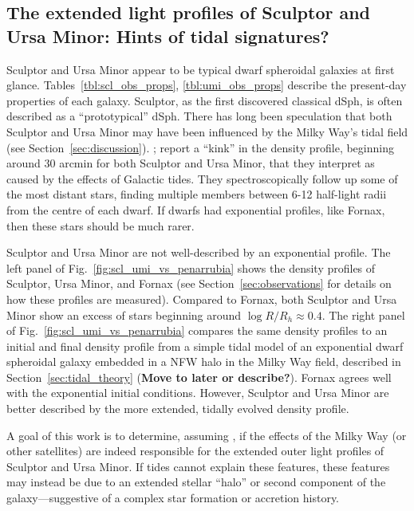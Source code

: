 \subsection{The extended light profiles of Sculptor and Ursa Minor:
Hints of tidal
signatures?}\label{the-extended-light-profiles-of-sculptor-and-ursa-minor-hints-of-tidal-signatures}

Sculptor and Ursa Minor appear to be typical dwarf spheroidal galaxies
at first glance. Tables~\ref{tbl:scl_obs_props}, \ref{tbl:umi_obs_props}
describe the present-day properties of each galaxy. Sculptor, as the
first discovered classical dSph, is often described as a
``prototypical'' dSph. There has long been speculation that both
Sculptor and Ursa Minor may have been influenced by the Milky Way's
tidal field (see Section~\ref{sec:discussion}). \citet{sestito+2023a};
\citet{sestito+2023b} report a ``kink'' in the density profile,
beginning around 30 arcmin for both Sculptor and Ursa Minor, that they
interpret as caused by the effects of Galactic tides. They
spectroscopically follow up some of the most distant stars, finding
multiple members between 6-12 half-light radii from the centre of each
dwarf. If dwarfs had exponential profiles, like Fornax, then these stars
should be much rarer.

Sculptor and Ursa Minor are not well-described by an exponential
profile. The left panel of Fig.~\ref{fig:scl_umi_vs_penarrubia} shows
the density profiles of Sculptor, Ursa Minor, and Fornax (see
Section~\ref{sec:observations} for details on how these profiles are
measured). Compared to Fornax, both Sculptor and Ursa Minor show an
excess of stars beginning around \(\log R/R_h\approx 0.4\). The right
panel of Fig.~\ref{fig:scl_umi_vs_penarrubia} compares the same density
profiles to an initial and final density profile from a simple tidal
model of an exponential dwarf spheroidal galaxy embedded in a NFW halo
in the Milky Way field, described in Section~\ref{sec:tidal_theory}
(\textbf{Move to later or describe?}). Fornax agrees well with the
exponential initial conditions. However, Sculptor and Ursa Minor are
better described by the more extended, tidally evolved density profile.

A goal of this work is to determine, assuming \LCDM, if the effects of
the Milky Way (or other satellites) are indeed responsible for the
extended outer light profiles of Sculptor and Ursa Minor. If tides
cannot explain these features, these features may instead be due to an
extended stellar ``halo'' or second component of the galaxy---suggestive
of a complex star formation or accretion history.

